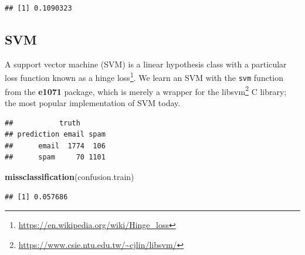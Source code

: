 \documentclass[]{book}
\newenvironment{Shaded}{\begin{snugshade}}{\end{snugshade}}
\newcommand{\CommentTok}[1]{\textcolor[rgb]{0.56,0.35,0.01}{\textit{#1}}}
\newcommand{\DataTypeTok}[1]{\textcolor[rgb]{0.13,0.29,0.53}{#1}}
\newcommand{\FloatTok}[1]{\textcolor[rgb]{0.00,0.00,0.81}{#1}}
\newcommand{\KeywordTok}[1]{\textcolor[rgb]{0.13,0.29,0.53}{\textbf{#1}}}
\newcommand{\NormalTok}[1]{#1}
\newcommand{\OperatorTok}[1]{\textcolor[rgb]{0.81,0.36,0.00}{\textbf{#1}}}
\newcommand{\StringTok}[1]{\textcolor[rgb]{0.31,0.60,0.02}{#1}}
\renewcommand{\href}[2]{#2\footnote{\url{#1}}}
\theoremstyle{definition}
\theoremstyle{definition}
\theoremstyle{definition}
\theoremstyle{remark}
\begin{document}
\begin{verbatim}
## [1] 0.1090323
\end{verbatim}

\hypertarget{svm}{%
\subsection{SVM}\label{svm}}

A support vector machine (SVM) is a linear hypothesis class with a particular loss function known as a \href{https://en.wikipedia.org/wiki/Hinge_loss}{hinge loss}.
We learn an SVM with the \texttt{svm} function from the \textbf{e1071} package, which is merely a wrapper for the \href{https://www.csie.ntu.edu.tw/~cjlin/libsvm/}{libsvm} C library; the most popular implementation of SVM today.

\begin{Shaded}
\end{Shaded}

\begin{verbatim}
##           truth
## prediction email spam
##      email  1774  106
##      spam     70 1101
\end{verbatim}

\begin{Shaded}
\begin{Highlighting}[]
\KeywordTok{missclassification}\NormalTok{(confusion.train)}
\end{Highlighting}
\end{Shaded}

\begin{verbatim}
## [1] 0.057686
\end{verbatim}

\begin{Shaded}
\end{Shaded}
\end{document}
